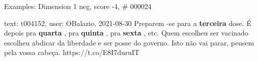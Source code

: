 \begin{frame}{Examples: Dimension 1 neg, score -4, \# 000024}
\footnotesize
\begin{alertblock}{text: t004152, user: OBalazio, 2021-08-30}
Preparem -se para a \textbf{terceira} dose. É depois pra \textbf{quarta} , pra 
\textbf{quinta} , pra \textbf{sexta} , etc. Quem escolheu ser vacinado escolheu 
abdicar da liberdade e ser posse do governo. Isto não vai parar, pensem pela 
vossa cabeça. https://t.co/E8I7duruIT 
\end{alertblock}
\end{frame}
